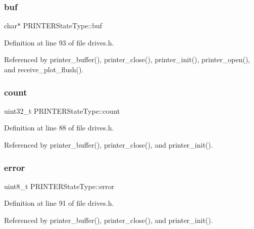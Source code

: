 \subsubsection{\texorpdfstring{buf}{buf}}
{\footnotesize\ttfamily char$\ast$ P\+R\+I\+N\+T\+E\+R\+State\+Type\+::buf}



Definition at line 93 of file drives.\+h.



Referenced by printer\+\_\+buffer(), printer\+\_\+close(), printer\+\_\+init(), printer\+\_\+open(), and receive\+\_\+plot\+\_\+flush().

\mbox{\label{structPRINTERStateType_ae115fc351910f3801e37b31f254fb8f4}} 
\subsubsection{\texorpdfstring{count}{count}}
{\footnotesize\ttfamily uint32\+\_\+t P\+R\+I\+N\+T\+E\+R\+State\+Type\+::count}



Definition at line 88 of file drives.\+h.



Referenced by printer\+\_\+buffer(), printer\+\_\+close(), and printer\+\_\+init().

\mbox{\label{structPRINTERStateType_a6e5b550f5396901febd5475445132dd0}} 
\subsubsection{\texorpdfstring{error}{error}}
{\footnotesize\ttfamily uint8\+\_\+t P\+R\+I\+N\+T\+E\+R\+State\+Type\+::error}



Definition at line 91 of file drives.\+h.



Referenced by printer\+\_\+buffer(), printer\+\_\+close(), and printer\+\_\+init().

\mbox{\label{structPRINTERStateType_a791c78d68d169f9d2e60d34b890e520a}} 
